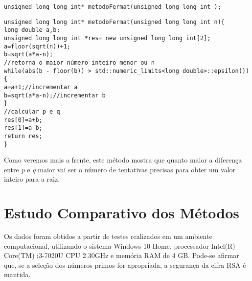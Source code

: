 \begin{lstlisting}[frame=single,mathescape=true,caption={Criptoanálise RSA ---Especificação de \texttt{MétodoFermat}},captionpos=b,label={lst:metodoFermat},basicstyle=\footnotesize]
unsigned long long int* metodoFermat(unsigned long long int );
\end{lstlisting}

\begin{lstlisting}[frame=single,mathescape=true,caption={Método de Fermat},captionpos=b,label={lst:MetodoFermat},basicstyle=\footnotesize]
unsigned long long int* metodoFermat(unsigned long long int n){
long double a,b;
unsigned long long int *res= new unsigned long long int[2];
a=floor(sqrt(n))+1;
b=sqrt(a*a-n);
//retorna o maior número inteiro menor ou n
while(abs(b - floor(b)) > std::numeric_limits<long double>::epsilon()){
a=a+1;//incrementar a
b=sqrt(a*a-n);//incrementar b
}
//calcular p e q
res[0]=a+b;
res[1]=a-b;
return res;
}
\end{lstlisting}
Como veremos mais a frente, este método mostra que quanto maior a diferença entre \emph{p} e \emph{q} maior vai ser o número de tentativas precisas para obter um valor inteiro para a raiz.

\section{Estudo Comparativo dos Métodos}
Os dados foram obtidos a partir de testes realizados em um ambiente computacional, utilizando o sistema Windows 10 Home, processador Intel(R) Core(TM) i3-7020U CPU 2.30GHz e memória RAM de 4 GB. 
Pode-se afirmar que, se a seleção dos números primos for apropriada, a segurança da cifra RSA é mantida.

